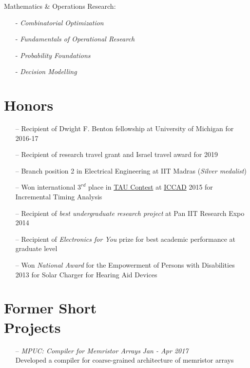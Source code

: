 \documentclass[margin,line,letter]{resume}
\begin{document}
\begin{resume}
\begin{itemize*}
        \vspace{-0.6cm}
        \phantom{xx}\hspace{0ex} Mathematics \& Operations Research:
        \vspace{-0.3cm}
        \begin{multicols}{2}
        \begin{itemize}
        \item[-] \emph{Combinatorial Optimization}
        \item[-] \emph{Fundamentals of Operational Research}
        \item[-] \emph{Probability Foundations}
        \item[-] \emph{Decision Modelling}
        \end{itemize}
        \end{multicols}
    \end{itemize*}

\section{\mysidestyle Honors}

    \noindent
    \begin{itemize}[leftmargin=*]
    \item[--] Recipient of Dwight F. Benton fellowship at University of Michigan for 2016-17
    \item[--] Recipient of research travel grant and Israel travel award for 2019
    \item[--] Branch position 2 in Electrical Engineering at IIT Madras (\textit{Silver medalist})
    \item[--] Won international $3^{rd}$ place in \href{https://sites.google.com/site/taucontest2015/}{TAU Contest} at \href{https://iccad.com/}{ICCAD} 2015 for Incremental Timing Analysis
    \item[--] Recipient of \textit{best undergraduate research project} at Pan IIT Research Expo 2014
    \item[--] Recipient of \textit{Electronics for You} prize for best academic performance at graduate level
    \item[--] Won \textit{National Award} for the Empowerment of Persons with Disabilities 2013 for Solar Charger for Hearing Aid Devices
    \end{itemize}

\section{\mysidestyle Former Short\\Projects}
    \noindent
    \begin{itemize}[leftmargin=*]
    \item[--] \textit{MPUC: Compiler for Memristor Arrays} \hfill \emph{Jan - Apr 2017} \\ Developed a compiler for coarse-grained architecture of memristor arrays
    

\end{itemize}
\end{resume}
\end{document}
